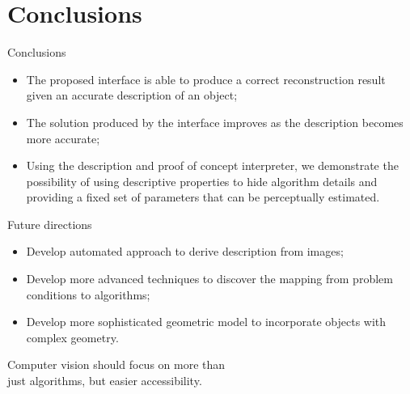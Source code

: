 \documentclass[10pt]{beamer}
\begin{document}
\section{Conclusions}
\begin{frame}{Conclusions}

\begin{exampleblock}{}

\begin{itemize}
\item The proposed interface is able to produce a correct reconstruction result given an accurate description of an object;
\item The solution produced by the interface improves as the description becomes more accurate;
\item Using the description and proof of concept interpreter, we demonstrate the possibility of using descriptive properties to hide algorithm details and providing a fixed set of parameters that can be perceptually estimated.
\end{itemize}

\end{exampleblock}

\end{frame}

\begin{frame}{Future directions}

\begin{exampleblock}{}

\begin{itemize}
\item Develop automated approach to derive description from images;
\item Develop more advanced techniques to discover the mapping from problem conditions to algorithms;
\item Develop more sophisticated geometric model to incorporate objects with complex geometry.
\end{itemize}

\end{exampleblock}

\end{frame}

\begin{frame}[standout]

Computer vision should focus on more than \\just algorithms, but easier accessibility.

\end{frame}
\end{document}
